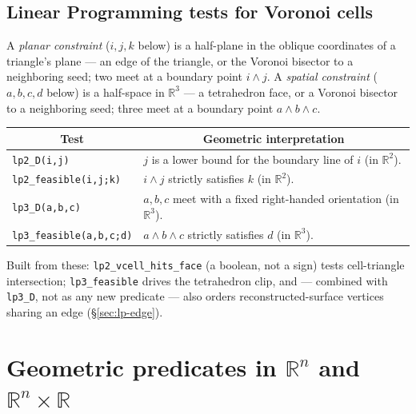 \documentclass[12pt]{article}
\theoremstyle{definition}
\theoremstyle{remark}
\begin{document}
\subsection{Linear Programming tests for Voronoi cells}

A \emph{planar constraint} ($i,j,k$ below) is a half-plane in the oblique
coordinates of a triangle's plane --- an edge of the triangle, or the
Voronoi bisector to a neighboring seed; two meet at a boundary point
$i\wedge j$. A \emph{spatial constraint} ($a,b,c,d$ below) is a half-space
in $\mathbb{R}^3$ --- a tetrahedron face, or a Voronoi bisector to a
neighboring seed; three meet at a boundary point $a\wedge b\wedge c$.

\begin{table}[h]
\begin{tabular}{|l|l|}
\hline
\multicolumn{1}{|c|}{\textbf{Test}} &
\multicolumn{1}{c|}{\textbf{Geometric interpretation}}\\
\hline\hline
\texttt{lp2\_D(i,j)} & $j$ is a lower bound for the boundary line of $i$ (in $\mathbb{R}^2$). \\
\hline
\texttt{lp2\_feasible(i,j;k)} & $i\wedge j$ strictly satisfies $k$ (in $\mathbb{R}^2$). \\
\hline\hline
\texttt{lp3\_D(a,b,c)} & $a,b,c$ meet with a fixed right-handed orientation (in $\mathbb{R}^3$). \\
\hline
\texttt{lp3\_feasible(a,b,c;d)} & $a\wedge b\wedge c$ strictly satisfies $d$ (in $\mathbb{R}^3$). \\
\hline
\end{tabular}
\end{table}

\noindent
Built from these: \texttt{lp2\_vcell\_hits\_face} (a boolean, not a sign)
tests cell-triangle intersection; \texttt{lp3\_feasible} drives the
tetrahedron clip, and --- combined with \texttt{lp3\_D}, not as any new
predicate --- also orders reconstructed-surface vertices sharing an edge
(\S\ref{sec:lp-edge}).




\newpage
\appendix

\section{Geometric predicates in $\mathbb{R}^n$ and $\mathbb{R}^n \times \mathbb{R}$}\label{appendix:predicates}
\end{document}
